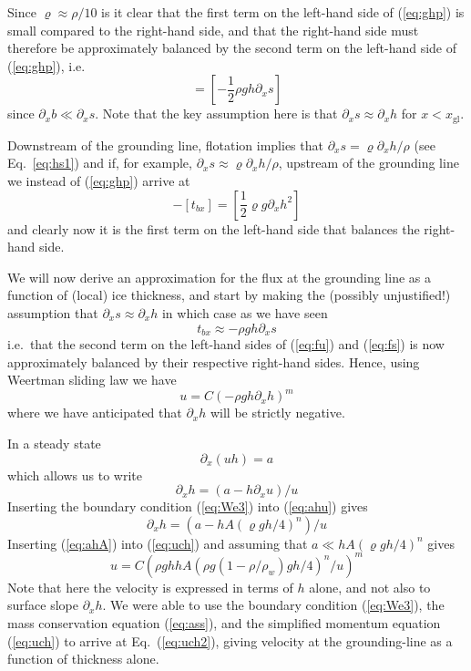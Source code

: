 \documentclass[10pt,a4paper]{book}
\newcommand{\p}{\partial}
\newcommand{\xgl}{x_{\mathrm{gl}}}
\begin{document}
Since $\varrho \approx \rho/10$ is it
clear that the first term on the left-hand side of (\ref{eq:ghp}) is
small compared to the right-hand side, and that the right-hand side
must therefore be approximately balanced by the second term on the
left-hand side of (\ref{eq:ghp}), i.e.
\begin{equation}
  [t_{bx}] = [-\frac{1}{2} \rho g h \p_x s]
\label{eq:ghp2}
\end{equation}
since $\p_x b \ll \p_x s$.  Note that the key assumption here is that
$\p_x s \approx \p_x h$ for $x < \xgl$.

Downstream of the
grounding line, flotation implies that $\p_x s = \varrho \p_x h/\rho$
(see Eq.~\ref{eq:hs1}) and if, for example, $\p_x s \approx 
\varrho \p_x h / \rho$, upstream of the grounding line we instead of
(\ref{eq:ghp}) arrive at
\begin{equation}
[\frac{1}{2}\varrho g h^2] - [t_{bx}] = [\frac{1}{2} \varrho g  \p_x h^2]
\label{eq:ghp}
\end{equation}
and clearly now it is the first term on the left-hand side that balances the right-hand
side.




We will now derive an approximation for the flux at the grounding line
as a function of (local) ice thickness, and start by making the
(possibly unjustified!) assumption that $\p_x s \approx \p_x h$ in which case as we have seen
\[
t_{bx} \approx - \rho g h \p_x s
\]
i.e.\ that the second term on the left-hand sides of (\ref{eq:fu}) and
(\ref{eq:fs}) is now approximately balanced by their respective right-hand
sides.  Hence, using Weertman sliding law we have
\begin{equation}
   u = C (-\rho g h \p_x h )^m 
\label{eq:uch}
\end{equation}
where we have anticipated that $\p_x h$ will be strictly negative. 


In a steady state
\begin{equation}
  \p_x (uh) = a \label{eq:ass}
\end{equation}
which allows us to write
\begin{equation}
 \p_x h =(a- h \p_x u)/u 
\label{eq:ahu}
\end{equation}
Inserting the boundary condition (\ref{eq:We3}) into (\ref{eq:ahu}) gives
\begin{equation}
\p_x h =(a- h A (\varrho g h/4)^n )/u 
\label{eq:ahA}
\end{equation}
Inserting (\ref{eq:ahA}) into (\ref{eq:uch}) and assuming that $a \ll
h A (\varrho g h/4)^n $ gives
\begin{equation}
   u = C \left (\rho g h h A (\rho g (1-\rho/\rho_w) g h/4)^n /u \right )^m 
\label{eq:uch2}
\end{equation}
Note that here the velocity is expressed in terms of $h$ alone, and
not also to surface slope $\p_x h$. We were able to use the boundary
condition (\ref{eq:We3}), the mass conservation equation
(\ref{eq:ass}), and the simplified momentum equation (\ref{eq:uch}) to
arrive at Eq.~(\ref{eq:uch2}), giving velocity at the grounding-line as a
function of thickness alone.
\end{document}
